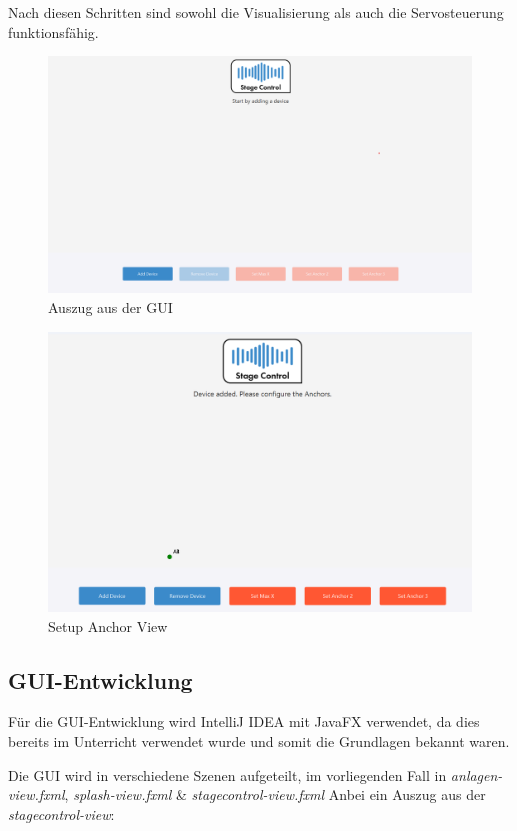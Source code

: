 Nach diesen Schritten sind sowohl die Visualisierung als auch die Servosteuerung funktionsfähig.

\begin{figure}[H]
	\centering
	\includegraphics[width=0.9\linewidth]{images/stagecontrol-overview.png}
	\caption[Auszug aus der GUI]{Auszug aus der GUI}
	\label{fig:StageControlOverview}
\end{figure}

\begin{figure}[H]
	\centering
	\includegraphics[width=0.9\linewidth]{images/stagecontrol-setupanchor.png}
	\caption[Setup Anchor View]{Setup Anchor View}
	\label{fig:StageControlSetupAnchor}
\end{figure}

\newpage
\subsection{GUI-Entwicklung}
Für die GUI-Entwicklung wird IntelliJ IDEA mit JavaFX verwendet, da dies bereits im Unterricht verwendet wurde und somit die Grundlagen bekannt waren.

Die GUI wird in verschiedene Szenen aufgeteilt, im vorliegenden Fall in \textit{anlagen-view.fxml}, \textit{splash-view.fxml} \& \textit{stagecontrol-view.fxml}
Anbei ein Auszug aus der \textit{stagecontrol-view}:

